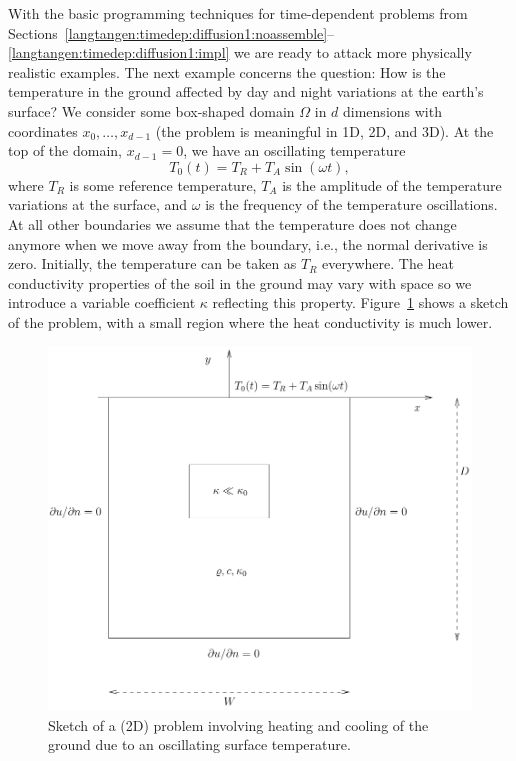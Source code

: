 With the basic programming techniques for time-dependent problems from 
Sections~\ref{langtangen:timedep:diffusion1:noassemble}--\ref{langtangen:timedep:diffusion1:impl}
we are ready to attack more physically realistic examples.
The next example concerns the question: How is the temperature in the
ground affected by day and night variations at the earth's surface?
We consider some box-shaped domain $\Omega$ in $d$ dimensions with
coordinates $x_0,\ldots,x_{d-1}$ (the problem is meaningful in 1D, 2D, and 3D).
At the top of the domain, $x_{d-1}=0$, we have an oscillating
temperature
\[ T_0(t) = T_R + T_A\sin (\omega t),\]
where $T_R$ is some reference temperature, $T_A$ is the amplitude of
the temperature variations at the surface, and $\omega$ is the frequency
of the temperature oscillations.
At all other boundaries we assume
that the temperature does not change anymore when we move away from
the boundary, i.e., the normal derivative is zero.
Initially, the temperature can be taken as $T_R$ everywhere.
The heat conductivity properties of the soil in the 
ground may vary with space so
we introduce a variable coefficient $\kappa$ reflecting this property.
Figure~\ref{langtangen:timedep:diffusion2:sin:fig1} shows a sketch of the
problem, with a small region where the heat conductivity is much lower.
\begin{figure}
\label{langtangen:timedep:diffusion2:sin:fig1}
\centerline{
\includegraphics[width=0.8\linewidth]{chapters/langtangen/pdf/daynight.pdf}
  }
  \caption{
  Sketch of a (2D) problem involving heating and cooling of the ground due
  to an oscillating surface temperature.
  }
\end{figure}

